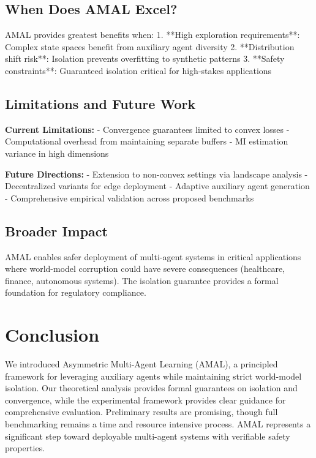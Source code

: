 \documentclass[12pt, a4paper]{article}
\begin{document}
\subsection{When Does AMAL Excel?}

AMAL provides greatest benefits when:
1. **High exploration requirements**: Complex state spaces benefit from auxiliary agent diversity
2. **Distribution shift risk**: Isolation prevents overfitting to synthetic patterns
3. **Safety constraints**: Guaranteed isolation critical for high-stakes applications

\subsection{Limitations and Future Work}

\textbf{Current Limitations:}
- Convergence guarantees limited to convex losses
- Computational overhead from maintaining separate buffers
- MI estimation variance in high dimensions

\textbf{Future Directions:}
- Extension to non-convex settings via landscape analysis
- Decentralized variants for edge deployment
- Adaptive auxiliary agent generation
- Comprehensive empirical validation across proposed benchmarks

\subsection{Broader Impact}

AMAL enables safer deployment of multi-agent systems in critical applications where world-model corruption could have severe consequences (healthcare, finance, autonomous systems). The isolation guarantee provides a formal foundation for regulatory compliance.

\section{Conclusion}

We introduced Asymmetric Multi-Agent Learning (AMAL), a principled framework for leveraging auxiliary agents while maintaining strict world-model isolation. Our theoretical analysis provides formal guarantees on isolation and convergence, while the experimental framework provides clear guidance for comprehensive evaluation. Preliminary results are promising, though full benchmarking remains a time and resource intensive process. AMAL represents a significant step toward deployable multi-agent systems with verifiable safety properties.
\end{document}
